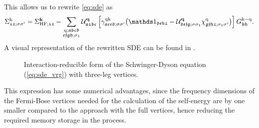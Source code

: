 \documentclass[\main/main.tex]{subfiles}
\begin{document}
This allows us to rewrite \eqref{eq:sde} as
\begin{align}\label{eq:sde_vrg}
	\Sigma_{\mathfrak{12};\ss'}^{\k}=\Sigma_{\text{HF};\mathfrak{12}}^{\vv{k}}-\sum_{\substack{\q;\mathfrak{abcd}\\\mathfrak{efgh};\sigma_1}}\mathcal{U}^{\vv{q}}_{\mathfrak{a1bc}}\left [\gamma_{\mathfrak{aced};\ss'}^{\q\k}\big (\unity_{\mathfrak{deh2}}-\mathcal{U}^{\vv{q}}_{\mathfrak{defg};\ss_1}\chi_{\mathfrak{gfh2};\sigma_1\sigma'}^{\q}\big)\right ]G_{\mathfrak{bh}}^{\k-\q}.
\end{align}
A visual representation of the rewritten SDE can be found in . 
\begin{figure}[ht!]
	\centering
  	
  	\caption{Interaction-reducible form of the Schwinger-Dyson equation (\ref{eq:sde_vrg}) with three-leg vertices.}
  	\label{fig:sde_vrg}
\end{figure}
This expression has some numerical advantages, since the frequency dimensions of the Fermi-Bose vertices needed for the calculation of the self-energy are by one smaller compared to the approach with the full vertices, hence reducing the required memory storage in the process. 
\\\\
\end{document}
